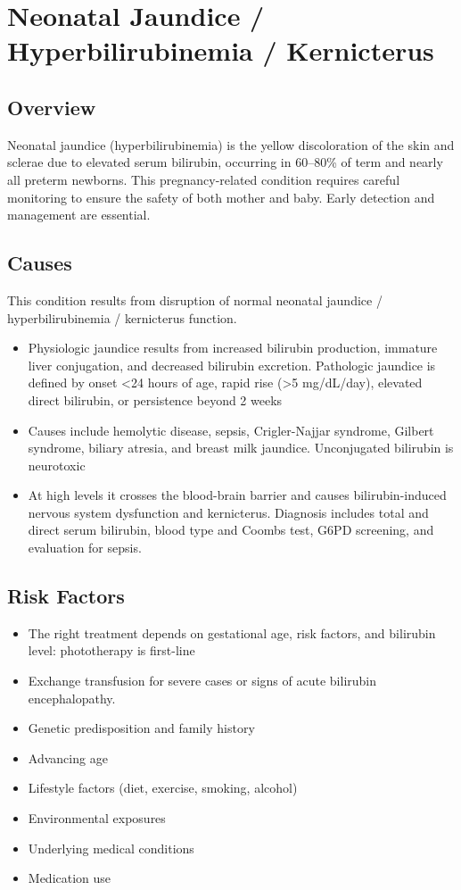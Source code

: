 \chapter{Neonatal Jaundice / Hyperbilirubinemia / Kernicterus}
\label{sec:Neonatal Jaundice}

\section{Overview}
Neonatal jaundice (hyperbilirubinemia) is the yellow discoloration of the skin and sclerae due to elevated serum bilirubin, occurring in 60--80\% of term and nearly all preterm newborns. This pregnancy-related condition requires careful monitoring to ensure the safety of both mother and baby. Early detection and management are essential.
\section{Causes}
This condition results from disruption of normal neonatal jaundice / hyperbilirubinemia / kernicterus function.

\begin{itemize}[noitemsep]
  \item Physiologic jaundice results from increased bilirubin production, immature liver conjugation, and decreased bilirubin excretion. Pathologic jaundice is defined by onset <24 hours of age, rapid rise (>5 mg/dL/day), elevated direct bilirubin, or persistence beyond 2 weeks
  \item Causes include hemolytic disease, sepsis, Crigler-Najjar syndrome, Gilbert syndrome, biliary atresia, and breast milk jaundice. Unconjugated bilirubin is neurotoxic
  \item At high levels it crosses the blood-brain barrier and causes bilirubin-induced nervous system dysfunction and kernicterus. Diagnosis includes total and direct serum bilirubin, blood type and Coombs test, G6PD screening, and evaluation for sepsis.
\end{itemize}
\section{Risk Factors}
\begin{itemize}[noitemsep]
  \item The right treatment depends on gestational age, risk factors, and bilirubin level: phototherapy is first-line
  \item Exchange transfusion for severe cases or signs of acute bilirubin encephalopathy.
  \item Genetic predisposition and family history
  \item Advancing age
  \item Lifestyle factors (diet, exercise, smoking, alcohol)
  \item Environmental exposures
  \item Underlying medical conditions
  \item Medication use
\end{itemize}

